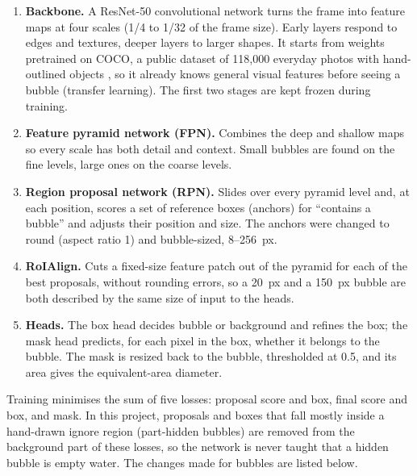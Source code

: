 \begin{enumerate}
\tightlist
\item \textbf{Backbone.} A ResNet-50 convolutional network turns the frame
into feature maps at four scales (1/4 to 1/32 of the frame size). Early
layers respond to edges and textures, deeper layers to larger shapes. It
starts from weights pretrained on COCO, a public dataset of 118,000
everyday photos with hand-outlined objects \citep{lin2014}, so it already
knows general visual features before seeing a bubble (transfer learning).
The first two stages are kept frozen during training.
\item \textbf{Feature pyramid network (FPN).} Combines the deep and shallow
maps so every scale has both detail and context. Small bubbles are found on
the fine levels, large ones on the coarse levels.
\item \textbf{Region proposal network (RPN).} Slides over every pyramid
level and, at each position, scores a set of reference boxes (anchors) for
``contains a bubble'' and adjusts their position and size. The anchors were
changed to round (aspect ratio 1) and bubble-sized, 8--256~px.
\item \textbf{RoIAlign.} Cuts a fixed-size feature patch out of the pyramid
for each of the best proposals, without rounding errors, so a 20~px and a
150~px bubble are both described by the same size of input to the heads.
\item \textbf{Heads.} The box head decides bubble or background and refines
the box; the mask head predicts, for each pixel in the box, whether it
belongs to the bubble. The mask is resized back to the bubble, thresholded
at 0.5, and its area gives the equivalent-area diameter.
\end{enumerate}

Training minimises the sum of five losses: proposal score and box, final
score and box, and mask. In this project, proposals and boxes that fall
mostly inside a hand-drawn ignore region (part-hidden bubbles) are removed
from the background part of these losses, so the network is never taught
that a hidden bubble is empty water. The changes made for bubbles are listed
below.


